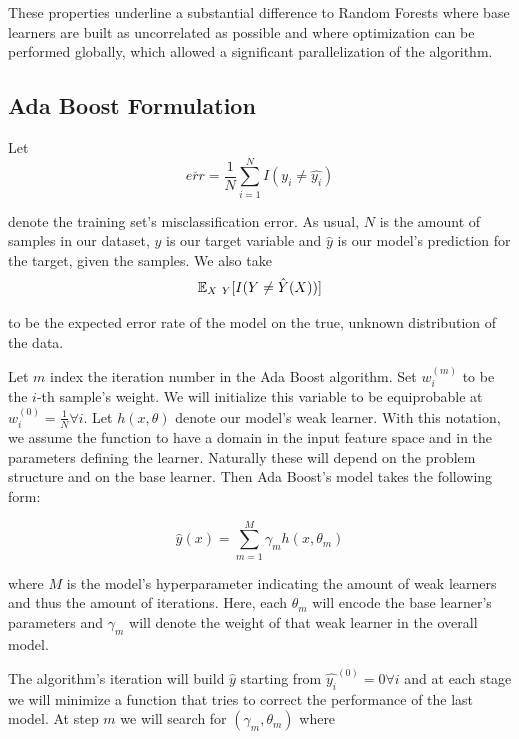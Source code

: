 These properties underline a substantial difference to Random Forests where base learners are built as uncorrelated as possible and where optimization can be performed globally, which allowed a significant parallelization of the algorithm.

\subsection{Ada Boost Formulation}

Let
\begin{equation} \label{equation-adaBoostTrainingError}
\overline{err} = \frac{1}{N} \sum_{i=1}^{N} I(y_i \neq \hat{y_i})
\end{equation}

denote the training set's misclassification error. As usual, $N$ is the amount of samples in our dataset, $y$ is our target variable and $\hat{y}$ is our model's prediction for the target, given the samples. We also take
\begin{equation}
\operatorname{\mathbb{E}}_{X \ Y} [ I(Y \neq \hat{Y}(X)) ]
\end{equation}

to be the expected error rate of the model on the true,  unknown distribution of the data.

Let $m$ index the iteration number in the Ada Boost algorithm. Set $w^{(m)}_i$ to be the $i$-th sample's weight. We will initialize this variable to be equiprobable at $w^{(0)}_i = \frac{1}{N} \forall i$. Let $h(x,\theta)$  denote our model's weak learner. With this notation, we assume the function to have a domain in the input feature space and in the parameters defining the learner. Naturally these will depend on the problem structure and on the base learner. Then Ada Boost's model takes the following form:

\begin{equation} \label{equation-adaBoostModel}
\hat{y}(x) = \sum_{m=1}^{M} \gamma_m h(x,\theta_m)
\end{equation}

where $M$ is the model's hyperparameter indicating the amount of weak learners and thus the amount of iterations. Here, each $\theta_m$ will encode the base learner's parameters and $\gamma_m$ will denote the weight of that weak learner in the overall model.

The algorithm's iteration will build $\hat{y}$ starting from $\hat{y_i}^{(0)}= 0 \forall i$ and at each stage we will minimize a function that tries to correct the performance of the last model. At step $m$ we will search for $(\gamma_{m}, \theta_{m})$ where

